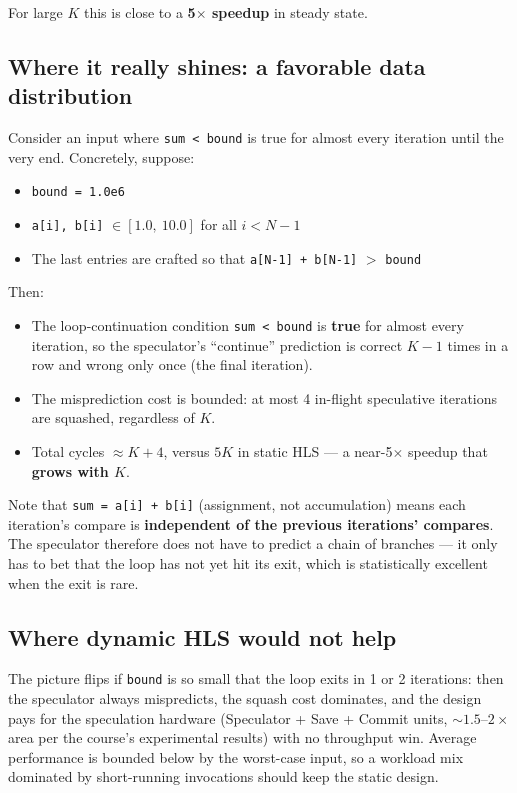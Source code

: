\documentclass[11pt,a4paper]{article}
\begin{document}
For large $K$ this is close to a \textbf{5$\times$ speedup} in steady state.

\subsection*{Where it really shines: a favorable data distribution}

Consider an input where \texttt{sum \textless\ bound} is true for almost every iteration until the very end. Concretely, suppose:

\begin{itemize}[noitemsep]
  \item \texttt{bound = 1.0e6}
  \item \texttt{a[i], b[i]} $\in [1.0,\ 10.0]$ for all $i < N-1$
  \item The last entries are crafted so that \texttt{a[N-1] + b[N-1]} $>$ \texttt{bound}
\end{itemize}

Then:

\begin{itemize}
  \item The loop-continuation condition \texttt{sum \textless\ bound} is \textbf{true} for almost every iteration, so the speculator's ``continue'' prediction is correct $K-1$ times in a row and wrong only once (the final iteration).
  \item The misprediction cost is bounded: at most 4 in-flight speculative iterations are squashed, regardless of $K$.
  \item Total cycles $\approx K + 4$, versus $5K$ in static HLS --- a near-5$\times$ speedup that \textbf{grows with $K$}.
\end{itemize}

Note that \texttt{sum = a[i] + b[i]} (assignment, not accumulation) means each iteration's compare is \textbf{independent of the previous iterations' compares}. The speculator therefore does not have to predict a chain of branches --- it only has to bet that the loop has not yet hit its exit, which is statistically excellent when the exit is rare.

\subsection*{Where dynamic HLS would not help}

The picture flips if \texttt{bound} is so small that the loop exits in 1 or 2 iterations: then the speculator always mispredicts, the squash cost dominates, and the design pays for the speculation hardware (Speculator + Save + Commit units, $\sim 1.5$--$2\times$ area per the course's experimental results) with no throughput win. Average performance is bounded below by the worst-case input, so a workload mix dominated by short-running invocations should keep the static design.
\end{document}
